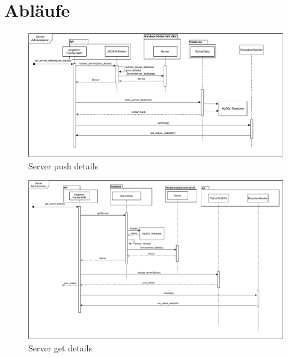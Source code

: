 \section{Abläufe}

\begin{figure}[H]
    \includegraphics[width=1\textwidth]{res/Server_Sequence.drawio.pdf} 
    \caption{Server push details}
\end{figure}
\begin{figure}[H]
    \includegraphics[width=1\textwidth]{res/server_get.drawio.pdf} 
    \caption{Server get details}
\end{figure}
\newpage

\newpage
